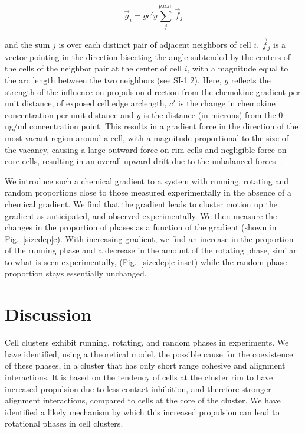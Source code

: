 \documentclass{article}
\begin{document}
\begin{equation}
\vec{g}_i = g c' y \sum_j^{p. a. n.} \vec{f}_{j}
\label{grad}
\end{equation}

and the sum $j$ is over each distinct pair of adjacent neighbors of cell $i$.  $\vec{f}_j$ is a vector pointing in the direction bisecting the angle subtended by the centers of the cells of the neighbor pair at the center of cell $i$, with a magnitude equal to the arc length between the two neighbors (see SI-1.2). Here, $g$ reflects the strength of the influence on propulsion direction from the chemokine gradient per unit distance, of exposed cell edge arclength, $c'$ is the change in chemokine concentration per unit distance and $y$ is the distance (in microns) from the $0$ ng/ml concentration point. This results in a gradient force in the direction of the most vacant region around a cell, with a magnitude proportional to the size of the vacancy, causing a large outward force on rim cells and negligible force on core cells, resulting in an overall upward drift due to the unbalanced forces~\cite{Malet-Engra2014}.

We introduce such a chemical gradient to a system with running, rotating and random proportions close to those measured experimentally in the absence of a chemical gradient. We find that the gradient leads to cluster motion up the gradient as anticipated, and observed experimentally. We then measure the changes in the proportion of phases as a function of the gradient (shown in Fig.~\ref{sizedep}c). With increasing gradient, we find an increase in the proportion of the running phase and a decrease in the amount of the rotating phase, similar to what is seen experimentally, (Fig.~\ref{sizedep}c inset) while the random phase proportion stays essentially unchanged.  

\section*{Discussion}

Cell clusters exhibit running, rotating, and random phases in experiments. We have identified, using a theoretical model, the possible cause for the coexistence of these phases, in a cluster that has only short range cohesive and alignment interactions. It is based on the tendency of cells at the cluster rim to have increased propulsion due to less contact inhibition, and therefore stronger alignment interactions, compared to cells at the core of the cluster.  We have identified a likely mechanism by which this increased propulsion can lead to rotational phases in cell clusters.  
\end{document}
